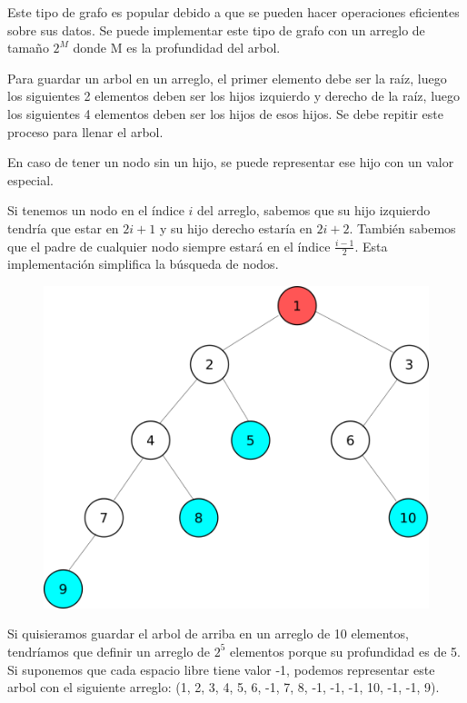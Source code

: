 \documentclass{article}
\begin{document}
Este tipo de grafo es popular debido a que se pueden hacer operaciones eficientes sobre sus datos. Se puede implementar este tipo de grafo con un arreglo de tamaño $2^M$ donde M es la profundidad del arbol.

Para guardar un arbol en un arreglo, el primer elemento debe ser la raíz, luego los siguientes 2 elementos deben ser los hijos izquierdo y derecho de la raíz, luego los siguientes 4 elementos deben ser los hijos de esos hijos. Se debe repitir este proceso para llenar el arbol.

En caso de tener un nodo sin un hijo, se puede representar ese hijo con un valor especial.

Si tenemos un nodo en el índice $i$ del arreglo, sabemos que su hijo izquierdo tendría que estar en $2i + 1$ y su hijo derecho estaría en $2i + 2$. También sabemos que el padre de cualquier nodo siempre estará en el índice $\frac{i - 1}{2}$. Esta implementación simplifica la búsqueda de nodos.

\begin{figure}[H]
    \centering
    \includegraphics[width=0.3\paperwidth]{arbolbinario}
\end{figure}

Si quisieramos guardar el arbol de arriba en un arreglo de 10 elementos, tendríamos que definir un arreglo de $2^5$ elementos porque su profundidad es de 5. Si suponemos que cada espacio libre tiene valor -1, podemos representar este arbol con el siguiente arreglo: (1, 2, 3, 4, 5, 6, -1, 7, 8, -1, -1, -1, 10, -1, -1, 9).
\end{document}

